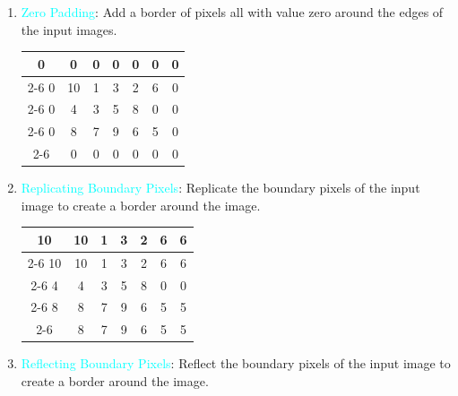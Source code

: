 \documentclass{book}
\begin{document}
\begin{enumerate}
    \item \textcolor{cyan}{Zero Padding}: Add a border of pixels all with value zero around the edges of the input images.
    \begin{table}[H]
        \centering
        \newcommand{\myline}{\cline{2-6}}
        \newcommand{\noline}[1]{\multicolumn{1}{c}{#1}}
        \begin{tabular}{c|c|c|c|c|c|c}
            \noline{0} & \noline{0} & \noline{0} & \noline{0} & \noline{0} & \noline{0} & \noline{0} \\
            \myline
            0 & 10 & 1 & 3 & 2 & 6 & 0 \\
            \myline
            0 & 4 & 3 & 5 & 8 & 0 & 0 \\
            \myline
            0 & 8 & 7 & 9 & 6 & 5 & 0 \\
            \myline
            \noline{0} & \noline{0} & \noline{0} & \noline{0} & \noline{0} & \noline{0} & \noline{0} \\
        \end{tabular}
    \end{table}
    \item \textcolor{cyan}{Replicating Boundary Pixels}: Replicate the boundary pixels of the input image to create a border around the image.
    \begin{table}[H]
        \centering
        \newcommand{\myline}{\cline{2-6}}
        \newcommand{\noline}[1]{\multicolumn{1}{c}{#1}}
        \begin{tabular}{c|c|c|c|c|c|c}
            \noline{10} & \noline{10} & \noline{1} & \noline{3} & \noline{2} & \noline{6} & \noline{6} \\
            \myline
            10 & 10 & 1 & 3 & 2 & 6 & 6 \\
            \myline
            4 & 4 & 3 & 5 & 8 & 0 & 0 \\
            \myline
            8 & 8 & 7 & 9 & 6 & 5 & 5 \\
            \myline
            \noline{8} & \noline{8} & \noline{7} & \noline{9} & \noline{6} & \noline{5} & \noline{5} \\
        \end{tabular}
    \end{table}
    \item \textcolor{cyan}{Reflecting Boundary Pixels}: Reflect the boundary pixels of the input image to create a border around the image.
    \begin{table}[H]

\end{table}
\end{enumerate}
\end{document}
